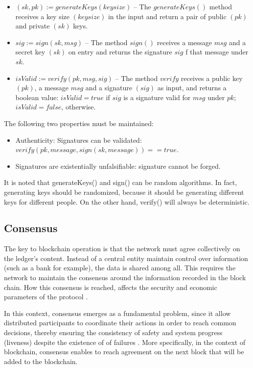 \begin{itemize}
\item $(sk , pk) := generateKeys(keysize)$ – The $generateKeys()$ method receives a key size $(keysize)$ in the input and return a pair of public $(pk)$ and private $(sk)$ keys.
\item $sig := sign(sk , msg)$ – The method $sign()$ receives a message $msg$ and a secret key $(sk)$ on entry and returns the signature $sig$ f that message under $sk$.
\item $isValid := veri f y(pk , msg , sig)$ – The method $verify$ receives a public key $(pk)$, a message $msg$ and a signature $(sig)$ as input, and returns a boolean value: $isValid = true$ if $sig$ is a signature valid for $msg$ under $pk$; $isValid = false$, otherwise.
\end{itemize}

The following two properties must be maintained:

\begin{itemize}
\item Authenticity: Signatures can be validated: \\ $verify(pk, message, sign(sk, message)) = = true$.
\item Signatures are existentially unfalsifiable: signature cannot be forged.
\end{itemize}

It is noted that generateKeys() and sign() can be random algorithms. In fact, generating keys should be randomized, because it should be generating different keys for different people. On the other hand, verify() will always be deterministic.

\subsection{Consensus}\label{sec:consenso}
The key to blockchain operation is that the network must agree collectively on the ledger's content. Instead of a central entity maintain control over information (such as a bank for example), the data is shared among all. This requires the network to maintain the consensus around the information recorded in the block chain. How this consensus is reached, affects the security and economic parameters of the protocol \cite{kostarev2017review}.

In this context, consensus emerges as a fundamental problem, since it allow distributed participants to coordinate their actions in order to reach common decisions, thereby ensuring the consistency of safety and system progress (liveness) despite the existence of of failures \cite{greve2018blockchain}. More specifically, in the context of blockchain, consensus enables to reach agreement on the next block that will be added to the blockchain.

